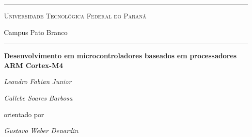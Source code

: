 \documentclass[a4paper,10pt,oneside]{book}
\begin{document}

\begin{titlepage}
	\centering
\rule{\textwidth}{1pt}
{\scshape \LARGE Universidade Tecnológica Federal do Paraná\par\vspace{5pt} \Large Campus Pato Branco}
	\rule{\textwidth}{1pt}
	\vfill
	{\huge\bfseries Desenvolvimento em microcontroladores baseados em processadores ARM Cortex-M4\par}
	\vfill
	\begin{minipage}{\textwidth}
		\centering
		\Large\itshape Leandro Fabian Junior\par
		\Large\itshape Callebe Soares Barbosa\par
	\end{minipage}
	\vspace{2cm}
	
	{orientado por\par
	\Large\itshape Gustavo Weber Denardin}

	\vfill


\end{titlepage}
\end{document}
